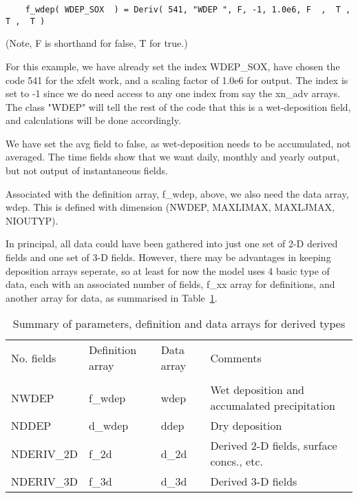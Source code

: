   \begin{small}\begin{verbatim}
    f_wdep( WDEP_SOX  ) = Deriv( 541, "WDEP ", F, -1, 1.0e6, F  ,  T , T ,  T )
  \end{verbatim}
  \end{small}

  (Note, F is shorthand for false, T for true.)\\
  \bigskip


 \noindent
  For this example, we have already set the index WDEP\_SOX, have chosen the code
  541 for the xfelt work, and a scaling factor of 1.0e6 for output. The index
  is set to -1 since we do need access to any one index from say the xn\_adv arrays.
   The class
  "WDEP" will tell the rest of the code that this is a wet-deposition field,
   and  calculations will be done accordingly. 

   We have set the avg field to false, as wet-deposition needs to be accumulated,
   not averaged. The time fields show that we want daily, monthly and yearly
   output, but not output of instantaneous fields.

   Associated with the definition array, f\_wdep, above, we also need the 
   data array, wdep.  This is defined with dimension (NWDEP, MAXLIMAX, MAXLJMAX, NIOUTYP).
   

   In principal, all data could have been gathered into just one set of 2-D derived
   fields and one set of 3-D fields. However, there may be advantages
   in keeping deposition arrays seperate, so at least for now the model uses 4
   basic type of data, each with an associated number of fields, f\_xx array for
   definitions, and  another array for data, as summarised in Table~\ref{TABDRV}.

   \begin{table}[h]
   \caption{Summary of parameters, definition and data arrays for derived types}
   \label{TABDRV}
   \begin{tabular}{|lllp{6cm}|}\hline
     No. fields    &  Definition array & Data array  & Comments  \\
                   &               &                 &           \\
     NWDEP         &    f\_wdep    &    wdep   & Wet deposition and accumalated precipitation  \\
     NDDEP         &    d\_wdep    &    ddep   & Dry deposition   \\
     NDERIV\_2D     &    f\_2d      &    d\_2d   & Derived 2-D fields, surface concs., etc.  \\
     NDERIV\_3D     &    f\_3d      &    d\_3d   & Derived 3-D fields  \\ \hline
   \end{tabular}
   \end{table}
